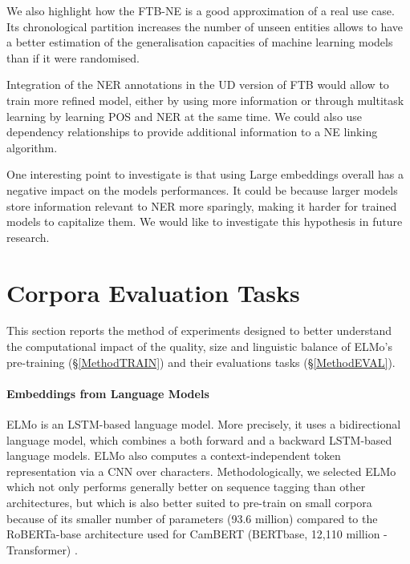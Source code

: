 We also highlight how the FTB-NE is a good approximation of a real use case. Its chronological partition increases the number of unseen entities allows to have a better estimation of the generalisation capacities of machine learning models than if it were randomised.

Integration of the NER annotations in the UD version of FTB would allow to train more refined model, either by using more information or through multitask learning by learning POS and NER at the same time. We could also use dependency relationships to provide additional information to a NE linking algorithm.

One interesting point to investigate is that using Large embeddings overall has a negative impact on the models performances. It could be because larger models store information relevant to NER more sparingly, making it harder for trained models to capitalize them. We would like to investigate this hypothesis in future research.





\section{Corpora Evaluation Tasks} \label{sect:EvalMethod}

This section reports the method of experiments designed to better understand the computational impact of the quality, size and linguistic balance of ELMo's \citep{peters-etal-2018-deep} pre-training (§\ref{MethodTRAIN}) and their evaluations tasks (§\ref{MethodEVAL}).

\paragraph{Embeddings from Language Models} ELMo is an LSTM-based language model. More precisely, it uses a bidirectional language model, which combines a both forward and a backward LSTM-based language models. ELMo also computes a context-independent token representation via a CNN over characters.
Methodologically, we selected ELMo which not only performs generally better on sequence tagging than other architectures, but which is also better suited to pre-train on small corpora because of its smaller number of parameters (93.6 million) compared to the RoBERTa-base architecture used for CamBERT (BERTbase, 12,110 million - Transformer) \citep{martin-etal-2020-camembert}.

